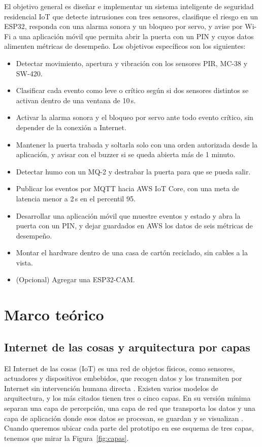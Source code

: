 \documentclass[manuscript,screen,nonacm]{acmart}
\begin{document}
El objetivo general es diseñar e implementar un sistema inteligente de seguridad residencial IoT que detecte intrusiones con tres sensores, clasifique el riesgo en un ESP32, responda con una alarma sonora y un bloqueo por servo, y avise por Wi-Fi a una aplicación móvil que permita abrir la puerta con un PIN y cuyos datos alimenten métricas de desempeño. Los objetivos específicos son los siguientes:
\begin{itemize}
  \item Detectar movimiento, apertura y vibración con los sensores PIR, MC-38 y SW-420.
  \item Clasificar cada evento como leve o crítico según si dos sensores distintos se activan dentro de una ventana de 10\,s.
  \item Activar la alarma sonora y el bloqueo por servo ante todo evento crítico, sin depender de la conexión a Internet.
  \item Mantener la puerta trabada y soltarla solo con una orden autorizada desde la aplicación, y avisar con el buzzer si se queda abierta más de 1 minuto.
  \item Detectar humo con un MQ-2 y destrabar la puerta para que se pueda salir.
  \item Publicar los eventos por MQTT hacia AWS IoT Core, con una meta de latencia menor a 2\,s en el percentil 95.
  \item Desarrollar una aplicación móvil que muestre eventos y estado y abra la puerta con un PIN, y dejar guardados en AWS los datos de seis métricas de desempeño.
  \item Montar el hardware dentro de una casa de cartón reciclado, sin cables a la vista.
  \item (Opcional) Agregar una ESP32-CAM.
\end{itemize}

\section{Marco teórico}
\label{sec:marco-teorico}

\subsection{Internet de las cosas y arquitectura por capas}
El Internet de las cosas (IoT) es una red de objetos físicos, como sensores, actuadores y dispositivos embebidos, que recogen datos y los transmiten por Internet sin intervención humana directa \cite{alfuqaha2015survey}. Existen varios modelos de arquitectura, y los más citados tienen tres o cinco capas. En su versión mínima separan una capa de percepción, una capa de red que transporta los datos y una capa de aplicación donde esos datos se procesan, se guardan y se visualizan \cite{alfuqaha2015survey, ray2018survey}. Cuando queremos ubicar cada parte del prototipo en ese esquema de tres capas, tenemos que mirar la Figura~\ref{fig:capas}.
\end{document}
